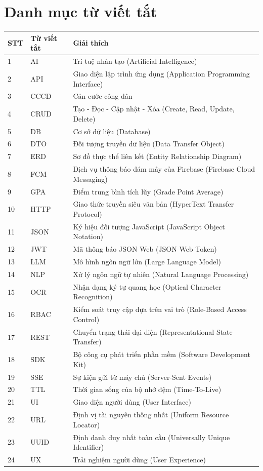 \documentclass[oneside,a4paper,14pt]{extreport}
\begin{document}
\chapter*{Danh mục từ viết tắt}
\begin{longtable}{|l|l|p{8.5cm}|}
\hline
\textbf{STT} & \textbf{Từ viết tắt} & \textbf{Giải thích} \\
\hline
\endhead
1  & AI     & Trí tuệ nhân tạo (Artificial Intelligence) \\ \hline
2  & API    & Giao diện lập trình ứng dụng (Application Programming Interface) \\ \hline
3  & CCCD   & Căn cước công dân \\ \hline
4  & CRUD   & Tạo - Đọc - Cập nhật - Xóa (Create, Read, Update, Delete) \\ \hline
5  & DB     & Cơ sở dữ liệu (Database) \\ \hline
6  & DTO    & Đối tượng truyền dữ liệu (Data Transfer Object) \\ \hline
7  & ERD    & Sơ đồ thực thể liên kết (Entity Relationship Diagram) \\ \hline
8  & FCM    & Dịch vụ thông báo đám mây của Firebase (Firebase Cloud Messaging) \\ \hline
9  & GPA    & Điểm trung bình tích lũy (Grade Point Average) \\ \hline
10 & HTTP   & Giao thức truyền siêu văn bản (HyperText Transfer Protocol) \\ \hline
11 & JSON   & Ký hiệu đối tượng JavaScript (JavaScript Object Notation) \\ \hline
12 & JWT    & Mã thông báo JSON Web (JSON Web Token) \\ \hline
13 & LLM    & Mô hình ngôn ngữ lớn (Large Language Model) \\ \hline
14 & NLP    & Xử lý ngôn ngữ tự nhiên (Natural Language Processing) \\ \hline
15 & OCR    & Nhận dạng ký tự quang học (Optical Character Recognition) \\ \hline
16 & RBAC   & Kiểm soát truy cập dựa trên vai trò (Role-Based Access Control) \\ \hline
17 & REST   & Chuyển trạng thái đại diện (Representational State Transfer) \\ \hline
18 & SDK    & Bộ công cụ phát triển phần mềm (Software Development Kit) \\ \hline
19 & SSE    & Sự kiện gửi từ máy chủ (Server-Sent Events) \\ \hline
20 & TTL    & Thời gian sống của bộ nhớ đệm (Time-To-Live) \\ \hline
21 & UI     & Giao diện người dùng (User Interface) \\ \hline
22 & URL    & Định vị tài nguyên thống nhất (Uniform Resource Locator) \\ \hline
23 & UUID   & Định danh duy nhất toàn cầu (Universally Unique Identifier) \\ \hline
24 & UX     & Trải nghiệm người dùng (User Experience) \\ \hline
\end{longtable}
\end{document}
